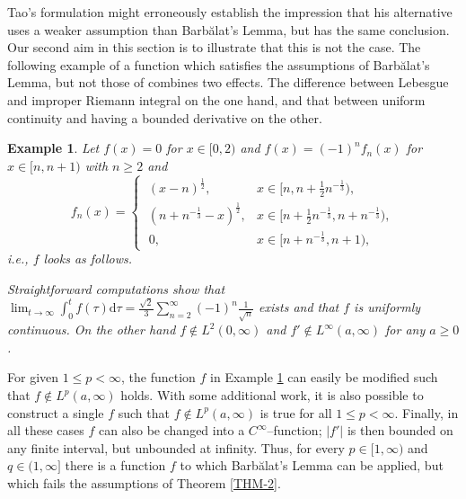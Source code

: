 \documentclass[10pt, a4paper, reqno]{amsart}
\theoremstyle{normal}
\newtheorem{ex}[thm]{Example}
\newcommand{\dd}{\mathrm{d}}
\begin{document}
\bigskip

Tao's formulation \cite[3rd paragraph on p.~698]{Tao} might erroneously establish the impression that his alternative \cite[Lemma 1]{Tao} uses a weaker assumption than Barb\u{a}lat's Lemma, but has the same conclusion. Our second aim in this section is to illustrate that this is not the case. The following example of a function which satisfies the assumptions of Barb\u{a}lat's Lemma, but not those of \cite[Lemma 1]{Tao} combines two effects. The difference between Lebesgue and improper Riemann integral on the one hand, and that between uniform continuity and having a bounded derivative on the other.

\smallskip

\begin{ex}\label{EXp} Let $f(x)=0$ for $x\in[0,2)$ and $f(x)=(-1)^nf_n(x)$ for $x\in[n,n+1)$ with $n\geqslant2$ and
$$
f_n(x)=\begin{cases}
\:(x-n)^{\frac{1}{2}},&x\in[n,n+\frac{1}{2}n^{-\frac{1}{3}}),\\
\:(n+n^{-\frac{1}{3}}-x)^{\frac{1}{2}},&x\in[n+\frac{1}{2}n^{-\frac{1}{3}},n+n^{-\frac{1}{3}}),\\
\;0,&x\in[n+n^{-\frac{1}{3}},n+1),
\end{cases}
$$
i.e., $f$ looks as follows.

\begin{center}

\end{center}
\noindent{}Straightforward computations show that $\lim_{t\rightarrow\infty}\int_0^tf(\tau)\dd\tau=\frac{\sqrt{2}}{3}\sum_{n=2}^{\infty}(-1)^n\frac{1}{\sqrt{n}}$ exists and that $f$ is uniformly continuous. On the other hand $f\not\in L^2(0,\infty)$ and $f'\not\in L^{\infty}(a,\infty)$ for any $a\geqslant0$.
\end{ex}

\medskip

For given $1\leqslant p<\infty$, the function $f$ in Example \ref{EXp} can easily be modified such that $f\not\in L^p(a,\infty)$ holds. With some additional work, it is also possible to construct a single $f$ such that $f\not\in L^p(a,\infty)$ is true for all $1\leqslant p<\infty$. Finally, in all these cases $f$ can also be changed into a $C^{\infty}$--function; $|f'|$ is then bounded on any finite interval, but unbounded at infinity. Thus, for every $p\in[1,\infty)$ and $q\in(1,\infty]$ there is a function $f$ to which Barb\u{a}lat's Lemma can be applied, but which fails the assumptions of Theorem \ref{THM-2}.
\end{document}

